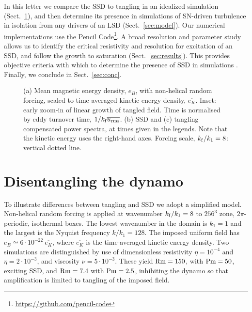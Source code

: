 \documentclass[preprint2]{aastex63}
\newcommand\Rm{{\rm Rm} }
\newcommand\Pm{{\rm Pm} }
\newcommand\kf{k_{\rm f} }
\begin{document}
In this letter we compare the SSD to tangling in an idealized simulation
(Sect.~\ref{sec:ssd-tang}), and then determine its presence in simulations of SN-driven 
turbulence in isolation from any drivers of an LSD (Sect.~\ref{sec:model}). 
Our numerical implementations use the {\sc Pencil Code}\footnote{
\href{https://github.com/pencil-code}{https://github.com/pencil-code}}.
A broad resolution and parameter study allows us to identify the critical
resistivity and resolution for excitation of an SSD, and follow the growth to
saturation (Sect.~\ref{sec:results}).
This provides objective criteria with which to determine the presence of SSD
in simulations \citep[such as][]{Gent:2013b,GE20,SBADMN19}.
Finally, we conclude in Sect.~\ref{sec:conc}.
\begin{figure*}
\caption{
 (a) Mean magnetic energy density, $e_B$, with non-helical random forcing,
 scaled to time-averaged kinetic energy density, $\overline{e_K}$.
 Inset: early zoom-in of linear growth of tangled field.
 Time is normalised by eddy turnover time, $1/\kf \overline{u_{\rm rms}}$.
 (b) SSD and (c) tangling compensated power spectra, at times given in the
 legends.  Note that the kinetic energy uses the right-hand axes.
  Forcing scale, $\kf/k_1=8$: vertical dotted line.
\label{fig:tangling}}
\end{figure*}

\section{Disentangling the dynamo} \label{sec:ssd-tang}

 To illustrate differences between tangling and SSD we adopt a simplified
 model.
 Non-helical random forcing is applied at wavenumber $\kf/k_1=8$ to
 $256^3$ zone, $2\pi$-periodic, isothermal boxes.
 The lowest wavenumber in the domain is $k_1=1$
    and the largest is the Nyquist frequency $k/k_1 = 128$.
 The imposed uniform field has $e_B\simeq6\cdot10^{-22}~\overline{e_K}$, where
 $\overline{e_K}$ is the time-averaged kinetic energy density.
 Two simulations are distinguished by use of dimensionless
 resistivity $\eta=10^{-4}$
 and $\eta=2\cdot10^{-3}$, and viscosity $\nu=5\cdot10^{-3}$.
 These yield $\Rm=150$, with $\Pm = 50$, exciting SSD, and $\Rm=7.4$ with
 $\Pm=2.5$, inhibiting the dynamo so that amplification is limited to tangling
 of the imposed field.
\end{document}
